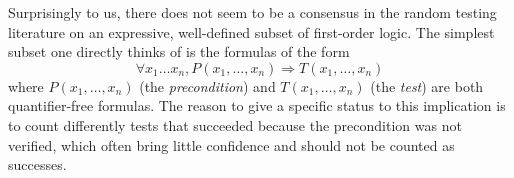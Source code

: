 Surprisingly to us, there does not seem to be a consensus in the
random testing literature on an expressive, well-defined subset of
first-order logic. The simplest subset one directly thinks of is the
formulas of the form
\[ \forall x_1 \dots x_n, P(x_1, \dots, x_n) \Rightarrow T(x_1, \dots,
x_n) \] where $P(x_1, \dots, x_n)$ (the \emph{precondition}) and
$T(x_1, \dots, x_n)$ (the \emph{test}) are both quantifier-free
formulas. The reason to give a specific status to this implication is
to count differently tests that succeeded because the precondition was
not verified, which often bring little confidence and should not be
counted as successes.
